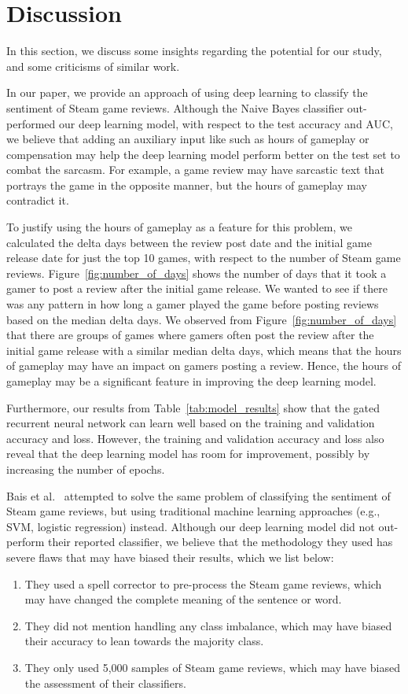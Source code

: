 \documentclass[conference]{IEEEtran}
\begin{document}
\section{Discussion}
In this section, we discuss some insights regarding the potential for our study, and some criticisms of similar work.

In our paper, we provide an approach of using deep learning to classify the sentiment of Steam game reviews. Although the Naive Bayes classifier out-performed our deep learning model, with respect to the test accuracy and AUC, we believe that adding an auxiliary input like such as hours of gameplay or compensation may help the deep learning model perform better on the test set to combat the sarcasm. For example, a game review may have sarcastic text that portrays the game in the opposite manner, but the hours of gameplay may contradict it. 


To justify using the hours of gameplay as a feature for this problem, we calculated the delta days between the review post date and the initial game release date for just the top 10 games, with respect to the number of Steam game reviews. Figure~\ref{fig:number_of_days} shows the number of days that it took a gamer to post a review after the initial game release. We wanted to see if there was any pattern in how long a gamer played the game before posting reviews based on the median delta days. We observed from Figure~\ref{fig:number_of_days} that there are groups of games where gamers often post the review after the initial game release with a similar median delta days, which means that the hours of gameplay may have an impact on gamers posting a review. Hence, the hours of gameplay may be a significant feature in improving the deep learning model.


Furthermore, our results from Table~\ref{tab:model_results} show that the gated recurrent neural network can learn well based on the training and validation accuracy and loss. However, the training and validation accuracy and loss also reveal that the deep learning model has room for improvement, possibly by increasing the number of epochs.


Bais et al.~\cite{baissentiment} attempted to solve the same problem of classifying the sentiment of Steam game reviews, but using traditional machine learning approaches (e.g., SVM, logistic regression) instead. Although our deep learning model did not out-perform their reported classifier, we believe that the methodology they used has severe flaws that may have biased their results, which we list below:
	\begin{enumerate}
		\item They used a spell corrector to pre-process the Steam game reviews, which may have changed the complete meaning of the sentence or word.
		\item They did not mention handling any class imbalance, which may have biased their accuracy to lean towards the majority class.
		\item They only used 5,000 samples of Steam game reviews, which may have biased the assessment of their classifiers.
	\end{enumerate}
	
\end{document}
